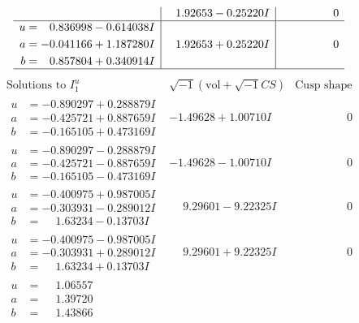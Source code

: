 \documentclass[1p]{elsarticle_modified}
\theoremstyle{definition}
\newcommand{\I}{\sqrt{-1}}
\begin{document}
$$\begin{array}{c|c|c}
 & \phantom{-}1.92653 - 0.25220 I & \phantom{-0.000000 } 0 \\ \hline\begin{aligned}
u &= \phantom{-}0.836998 - 0.614038 I \\
a &= -0.041166 + 1.187280 I \\
b &= \phantom{-}0.857804 + 0.340914 I\end{aligned}
 & \phantom{-}1.92653 + 0.25220 I & \phantom{-0.000000 } 0\\
 \hline 
 \end{array}$$\newpage$$\begin{array}{c|c|c}  
\text{Solutions to }I^u_{1}& \I (\text{vol} + \sqrt{-1}CS) & \text{Cusp shape}\\
 \hline 
\begin{aligned}
u &= -0.890297 + 0.288879 I \\
a &= -0.425721 + 0.887659 I \\
b &= -0.165105 + 0.473169 I\end{aligned}
 & -1.49628 + 1.00710 I & \phantom{-0.000000 } 0 \\ \hline\begin{aligned}
u &= -0.890297 - 0.288879 I \\
a &= -0.425721 - 0.887659 I \\
b &= -0.165105 - 0.473169 I\end{aligned}
 & -1.49628 - 1.00710 I & \phantom{-0.000000 } 0 \\ \hline\begin{aligned}
u &= -0.400975 + 0.987005 I \\
a &= -0.303931 - 0.289012 I \\
b &= \phantom{-}1.63234 - 0.13703 I\end{aligned}
 & \phantom{-}9.29601 - 9.22325 I & \phantom{-0.000000 } 0 \\ \hline\begin{aligned}
u &= -0.400975 - 0.987005 I \\
a &= -0.303931 + 0.289012 I \\
b &= \phantom{-}1.63234 + 0.13703 I\end{aligned}
 & \phantom{-}9.29601 + 9.22325 I & \phantom{-0.000000 } 0 \\ \hline\begin{aligned}
u &= \phantom{-}1.06557\phantom{ +0.000000I} \\
a &= \phantom{-}1.39720\phantom{ +0.000000I} \\
b &= \phantom{-}1.43866\phantom{ +0.000000I}\end{aligned}

\end{array}$$
\end{document}
